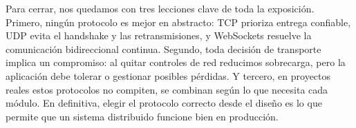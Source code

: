 Para cerrar, nos quedamos con tres lecciones clave de toda la exposición.
Primero, ningún protocolo es mejor en abstracto: TCP prioriza entrega confiable, UDP evita el handshake y las retransmisiones, y WebSockets resuelve la comunicación bidireccional continua.
Segundo, toda decisión de transporte implica un compromiso: al quitar controles de red reducimos sobrecarga, pero la aplicación debe tolerar o gestionar posibles pérdidas.
Y tercero, en proyectos reales estos protocolos no compiten, se combinan según lo que necesita cada módulo.
En definitiva, elegir el protocolo correcto desde el diseño es lo que permite que un sistema distribuido funcione bien en producción.
